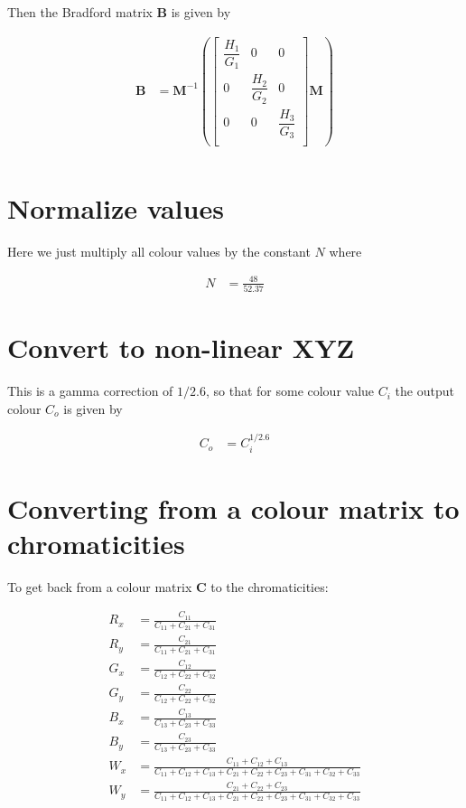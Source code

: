 \documentclass{article}
\begin{document}
Then the Bradford matrix $\mathbf{B}$ is given by

\begin{align}
\mathbf{B} &= \mathbf{M}^{-1}
\left(\left[\begin{matrix} \dfrac{H_1}{G_1} & 0 & 0 \\ 0 & \dfrac{H_2}{G_2} & 0 \\ 0 & 0 & \dfrac{H_3}{G_3} \\ \end{matrix}\right] \mathbf{M}\right) \\
\end{align}


\section{Normalize values}

Here we just multiply all colour values by the constant $N$ where

\begin{align}
N &= \frac{48}{52.37}
\end{align}


\section{Convert to non-linear XYZ}

This is a gamma correction of $1/2.6$, so that for some colour value $C_i$ the output colour $C_o$ is given by

\begin{align}
C_o &= C_i ^ {1/2.6}
\end{align}


\section{Converting from a colour matrix to chromaticities}

To get back from a colour matrix $\mathbf{C}$ to the chromaticities:

\begin{align}
R_x &= \frac{C_{11}}{C_{11} + C_{21} + C_{31}} \\
R_y &= \frac{C_{21}}{C_{11} + C_{21} + C_{31}} \\
G_x &= \frac{C_{12}}{C_{12} + C_{22} + C_{32}} \\
G_y &= \frac{C_{22}}{C_{12} + C_{22} + C_{32}} \\
B_x &= \frac{C_{13}}{C_{13} + C_{23} + C_{33}} \\
B_y &= \frac{C_{23}}{C_{13} + C_{23} + C_{33}} \\
W_x &= \frac{C_{11} + C_{12} + C_{13}}{C_{11} + C_{12} + C_{13} + C_{21} + C_{22} + C_{23} + C_{31} + C_{32} + C_{33}} \\
W_y &= \frac{C_{21} + C_{22} + C_{23}}{C_{11} + C_{12} + C_{13} + C_{21} + C_{22} + C_{23} + C_{31} + C_{32} + C_{33}}
\end{align}
\end{document}
